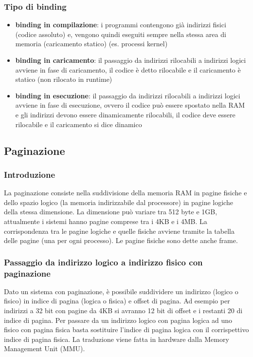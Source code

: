 \documentclass[a4paper]{article}
\begin{document}
\subsubsection*{Tipo di binding}
\begin{itemize}
	\item \textbf{binding in compilazione}: i programmi contengono già indirizzi fisici (codice assoluto) e, vengono quindi
	eseguiti sempre nella stessa area di memoria (caricamento statico) (es. processi kernel)
	\item \textbf{binding in caricamento}: il passaggio da indirizzi rilocabili a indirizzi logici avviene in fase di caricamento,
	il codice è detto rilocabile e il caricamento è statico (non rilocato in runtime)
	\item \textbf{binding in esecuzione}: il passaggio da indirizzi rilocabili a indirizzi logici avviene in fase di esecuzione,
	ovvero il codice può essere spostato nella RAM e gli indirizzi devono essere dinamicamente rilocabili, il codice deve essere
	rilocabile e il caricamento si dice dinamico
\end{itemize}


\subsection{Paginazione}
\subsubsection*{Introduzione}
La paginazione consiste nella suddivisione della memoria RAM in pagine fisiche e dello spazio logico (la memoria indirizzabile
dal processore) in pagine logiche della stessa dimensione. La dimensione può variare tra 512 byte e 1GB, attualmente i sistemi
hanno pagine comprese tra i 4KB e i 4MB. La corrispondenza tra le pagine logiche e quelle fisiche avviene tramite la tabella
delle pagine (una per ogni processo). Le pagine fisiche sono dette anche frame.

\subsubsection*{Passaggio da indirizzo logico a indirizzo fisico con paginazione}
Dato un sistema con paginazione, è possibile suddividere un indirizzo (logico o fisico) in indice di pagina (logica o fisica) e
offset di pagina. Ad esempio per indirizzi a 32 bit con pagine da 4KB si avranno 12 bit di offset e i restanti 20 di indice di
pagina. Per passare da un indirizzo logico con pagina logica ad uno fisico con pagina fisica basta sostituire l'indice di pagina
logica con il corrispettivo indice di pagina fisica. La traduzione viene fatta in hardware dalla Memory Management Unit (MMU).
\end{document}
